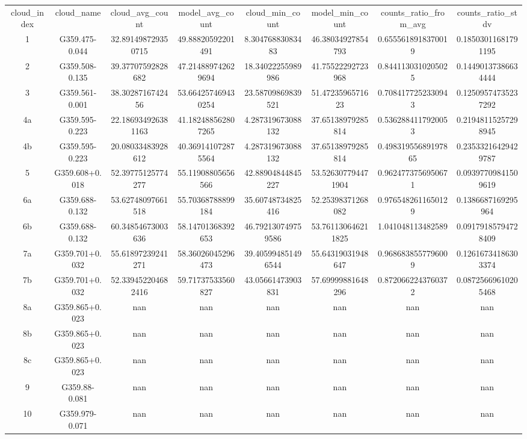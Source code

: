 \begin{table}
\begin{tabular}{cccccccc}
cloud_index & cloud_name & cloud_avg_count & model_avg_count & cloud_min_count & model_min_count & counts_ratio_from_avg & counts_ratio_stdv \\
1 & G359.475-0.044 & 32.891498729350715 & 49.88820592201491 & 8.30476883083483 & 46.38034927854793 & 0.6555618918370019 & 0.18503011681791195 \\
2 & G359.508-0.135 & 39.37707592828682 & 47.214889742629694 & 18.34022255989986 & 41.75522292723968 & 0.8441130310205025 & 0.14490137386634444 \\
3 & G359.561-0.001 & 38.3028716742456 & 53.664257469430254 & 23.58709869839521 & 51.4723596571623 & 0.7084177252330943 & 0.12509574735237292 \\
4a & G359.595-0.223 & 22.186934926381163 & 41.182488562807265 & 4.287319673088132 & 37.65138979285814 & 0.5362884117920053 & 0.21948115257298945 \\
4b & G359.595-0.223 & 20.08033483928612 & 40.369141072875564 & 4.287319673088132 & 37.65138979285814 & 0.49831955689197865 & 0.23533216429429787 \\
5 & G359.608+0.018 & 52.39775125774277 & 55.11908805656566 & 42.88904844845227 & 53.526307794471904 & 0.9624773756950671 & 0.09397709841509619 \\
6a & G359.688-0.132 & 53.62748097661518 & 55.70368788899184 & 35.60748734825416 & 52.25398371268082 & 0.9765482611650129 & 0.1386687169295964 \\
6b & G359.688-0.132 & 60.34854673003636 & 58.14701368392653 & 46.792130749759586 & 53.761130646211825 & 1.041048113482589 & 0.09179185794728409 \\
7a & G359.701+0.032 & 55.61897239241271 & 58.36026045296473 & 39.405994851496544 & 55.64319031948647 & 0.9686838557796009 & 0.12616734186303374 \\
7b & G359.701+0.032 & 52.339452204682416 & 59.71737533560827 & 43.05661473903831 & 57.69999881648296 & 0.8720662243760372 & 0.08725669610205468 \\
8a & G359.865+0.023 & nan & nan & nan & nan & nan & nan \\
8b & G359.865+0.023 & nan & nan & nan & nan & nan & nan \\
8c & G359.865+0.023 & nan & nan & nan & nan & nan & nan \\
9 & G359.88-0.081 & nan & nan & nan & nan & nan & nan \\
10 & G359.979-0.071 & nan & nan & nan & nan & nan & nan \\

\end{tabular}
\end{table}
